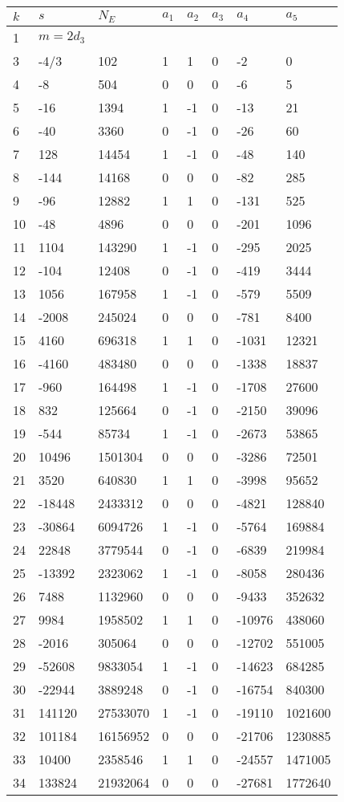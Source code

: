 \documentclass{amsart}
\begin{document}
\begin{longtable}{|l|l|l|lllll|}
\hline
$k$ & $s$ & $N_E$ & $a_1$ & $a_2$ & $a_3$ & $a_4$ & $a_5$\\
\hline
1&$m=2d_{3}$&&\multicolumn{5}{c|}{}\\
3&-4/3&102&1&1&0&-2&0\\
4&-8&504&0&0&0&-6&5\\
5&-16&1394&1&-1&0&-13&21\\
6&-40&3360&0&-1&0&-26&60\\
7&128&14454&1&-1&0&-48&140\\
8&-144&14168&0&0&0&-82&285\\
9&-96&12882&1&1&0&-131&525\\
10&-48&4896&0&0&0&-201&1096\\
11&1104&143290&1&-1&0&-295&2025\\
12&-104&12408&0&-1&0&-419&3444\\
13&1056&167958&1&-1&0&-579&5509\\
14&-2008&245024&0&0&0&-781&8400\\
15&4160&696318&1&1&0&-1031&12321\\
16&-4160&483480&0&0&0&-1338&18837\\
17&-960&164498&1&-1&0&-1708&27600\\
18&832&125664&0&-1&0&-2150&39096\\
19&-544&85734&1&-1&0&-2673&53865\\
20&10496&1501304&0&0&0&-3286&72501\\
21&3520&640830&1&1&0&-3998&95652\\
22&-18448&2433312&0&0&0&-4821&128840\\
23&-30864&6094726&1&-1&0&-5764&169884\\
24&22848&3779544&0&-1&0&-6839&219984\\
25&-13392&2323062&1&-1&0&-8058&280436\\
26&7488&1132960&0&0&0&-9433&352632\\
27&9984&1958502&1&1&0&-10976&438060\\
28&-2016&305064&0&0&0&-12702&551005\\
29&-52608&9833054&1&-1&0&-14623&684285\\
30&-22944&3889248&0&-1&0&-16754&840300\\
31&141120&27533070&1&-1&0&-19110&1021600\\
32&101184&16156952&0&0&0&-21706&1230885\\
33&10400&2358546&1&1&0&-24557&1471005\\
34&133824&21932064&0&0&0&-27681&1772640\\

\end{longtable}
\end{document}
